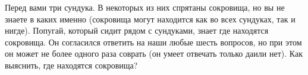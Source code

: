 Перед вами три сундука. В некоторых из них спрятаны сокровища, но вы не знаете в каких именно (сокровища могут находится как во всех сундуках, так и нигде). Попугай, который сидит рядом с сундуками, знает где находятся сокровища. Он согласился ответить на наши любые шесть вопросов, но при этом он может не более одного раза соврать (он умеет отвечать только \guillemotleft да\guillemotright или \guillemotleft нет\guillemotright). Как выяснить, где находятся сокровища?